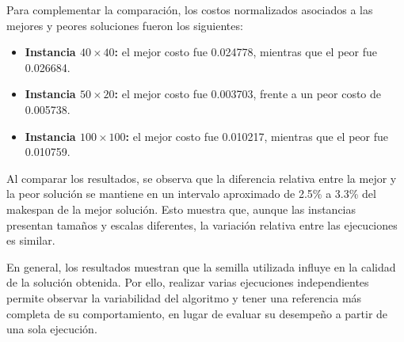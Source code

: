 \documentclass[12pt,a4paper]{article}
\begin{document}
\begin{table}[H]
    \centering
    \caption{Comparación entre la mejor y la peor solución por instancia.}
    \label{tab:comparacion-mejor-peor}
    \small
\end{table}

Para complementar la comparación, los costos normalizados asociados a las mejores y peores soluciones fueron los siguientes:

\begin{itemize}
    \item \textbf{Instancia $40 \times 40$:} el mejor costo fue 0.024778, mientras que el peor fue 0.026684.
    \item \textbf{Instancia $50 \times 20$:} el mejor costo fue 0.003703, frente a un peor costo de 0.005738.
    \item \textbf{Instancia $100 \times 100$:} el mejor costo fue 0.010217, mientras que el peor fue 0.010759.
\end{itemize}

Al comparar los resultados, se observa que la diferencia relativa entre la mejor y la peor solución se mantiene en un intervalo aproximado de 2.5\% a 3.3\% del makespan de la mejor solución. Esto muestra que, aunque las instancias presentan tamaños y escalas diferentes, la variación relativa entre las ejecuciones es similar.

En general, los resultados muestran que la semilla utilizada influye en la calidad de la solución obtenida. Por ello, realizar varias ejecuciones independientes permite observar la variabilidad del algoritmo y tener una referencia más completa de su comportamiento, en lugar de evaluar su desempeño a partir de una sola ejecución.\newpage
\end{document}
